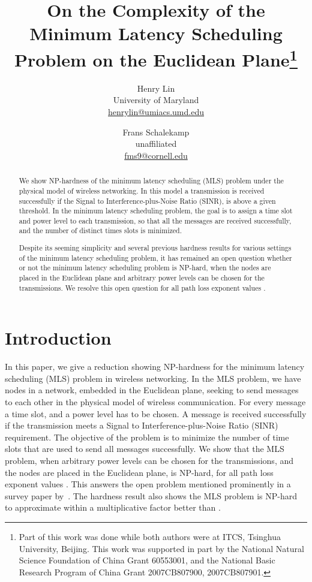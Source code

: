 \documentclass{article}
\begin{document}
\title{On the Complexity of the Minimum Latency Scheduling Problem on the Euclidean Plane\thanks{Part of this work was done while both authors were at ITCS, Tsinghua University, Beijing. This work was supported in
part by the National Natural Science Foundation of China Grant
60553001, and the National Basic Research Program of China Grant
2007CB807900, 2007CB807901.}}

\author{Henry Lin \\ University of Maryland 
\\ \url{henrylin@umiacs.umd.edu}
\and Frans Schalekamp \\ unaffiliated \\ \url{fms9@cornell.edu}
}

\maketitle

\begin{abstract}
We show NP-hardness of the minimum latency scheduling (MLS) problem under the physical model of wireless networking.  In this model a transmission is received successfully if the Signal to Interference-plus-Noise Ratio (SINR), is above a given threshold.  In the minimum latency scheduling problem, the goal is to assign a time slot and power level to each transmission, so that all the messages are received successfully, and the number of distinct times slots is minimized.

Despite its seeming simplicity and several previous hardness results for various settings of the minimum latency scheduling problem, it has remained an open question whether or not the minimum latency scheduling problem is NP-hard, when the nodes are placed in the Euclidean plane and arbitrary power levels can be chosen for the transmissions. We resolve this open question for all path loss exponent values .
\end{abstract}


\section{Introduction}
In this paper, we give a reduction showing NP-hardness for the minimum latency scheduling (MLS) problem in wireless networking. In the MLS problem, we have nodes in a network, embedded in the Euclidean plane, seeking to send messages to each other in the physical model of wireless communication. For every message a time slot, and a power level has to be chosen. A message is received successfully if the transmission meets a Signal to Interference-plus-Noise Ratio (SINR) requirement. The objective of the problem is to minimize the number of time slots that are used to send all messages successfully. We show that the MLS problem, when arbitrary power levels can be chosen for the transmissions, and the nodes are placed in the Euclidean plane, is NP-hard, for all path loss exponent values . This answers the open problem mentioned prominently in a survey paper by~\cite{LRW08}.   The hardness result also shows the MLS problem is NP-hard to approximate within a multiplicative factor better than .
\end{document}
